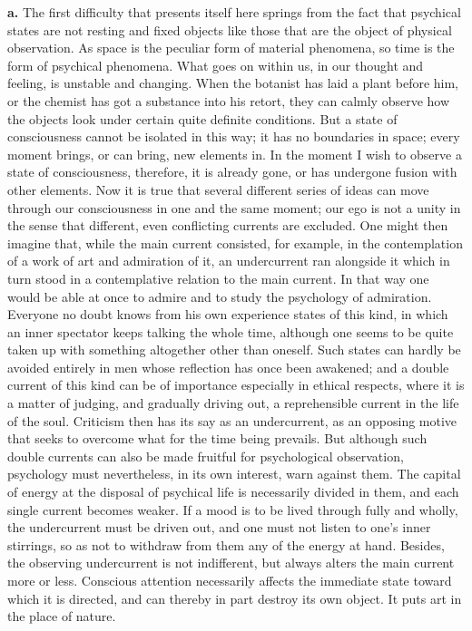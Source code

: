 \documentclass[12pt,a4paper]{book}
\newcommand{\opage}[1]{\marginnote{\footnotesize\textit{[#1]}}}
\begin{document}
\opage{19}\textbf{a.} The first difficulty that presents itself here
springs from the fact that psychical states are not resting and fixed
objects like those that are the object of physical observation. As space
is the peculiar form of material phenomena, so time is the form of
psychical phenomena. What goes on within us, in our thought and feeling,
is unstable and changing. When the botanist has laid a plant before him,
or the chemist has got a substance into his retort, they can calmly
observe how the objects look under certain quite definite conditions.
But a state of consciousness cannot be isolated in this way; it has no
boundaries in space; every moment brings, or can bring, new elements in.
In the moment I wish to observe a state of consciousness, therefore, it
is already gone, or has undergone fusion with other elements. Now it is
true that several different series of ideas can move through our
consciousness in one and the same moment; our ego is not a unity in the
sense that different, even conflicting currents are excluded. One might
then imagine that, while the main current consisted, for example, in the
contemplation of a work of art and admiration of it, an undercurrent ran
alongside it which in turn stood in a contemplative relation to the
main current. In that way one would be able at once to admire and to
study the psychology of admiration. Everyone no doubt knows from his own
experience states of this kind, in which an inner spectator keeps
talking the whole time, although one seems to be quite taken up with
something altogether other than oneself. Such states can hardly be
avoided entirely in men whose reflection has once been awakened; and a
double current of this kind can be of importance especially in ethical
respects, where it is a matter of judging, and gradually driving out, a
reprehensible current in the life of the soul. Criticism then has its
say as an undercurrent, as an opposing motive that seeks to overcome
what for the time being prevails. But although such double currents can
also be made fruitful
\opage{20}for psychological observation, psychology must nevertheless, in
its own interest, warn against them. The capital of energy at the
disposal of psychical life is necessarily divided in them, and each
single current becomes weaker. If a mood is to be lived through fully
and wholly, the undercurrent must be driven out, and one must not listen
to one's inner stirrings, so as not to withdraw from them any of the
energy at hand. Besides, the observing undercurrent is not indifferent,
but always alters the main current more or less. Conscious attention
necessarily affects the immediate state toward which it is directed, and
can thereby in part destroy its own object. It puts art in the place of
nature.
\end{document}
